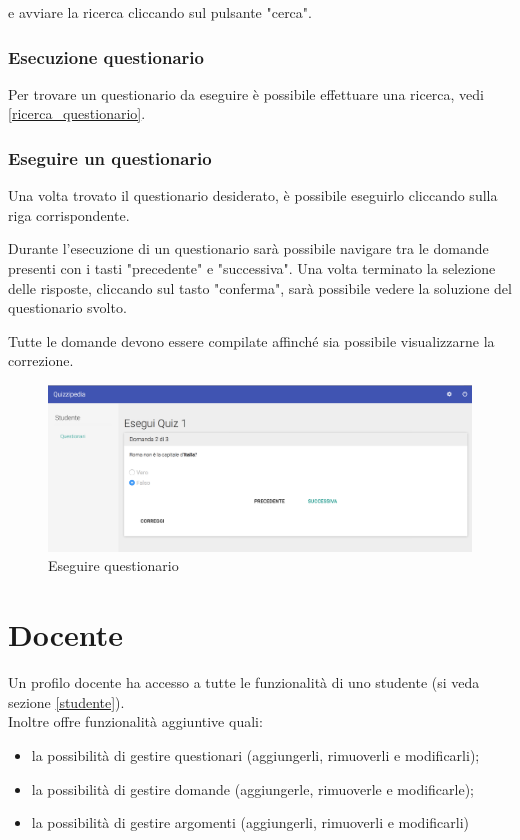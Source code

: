 \documentclass[12pt,a4paper]{article}
\begin{document}
	e avviare la ricerca cliccando sul pulsante "cerca".
	
	
	\subsubsection{Esecuzione questionario}
	Per trovare un questionario da eseguire è possibile effettuare una ricerca, vedi \ref{ricerca_questionario}.
	\subsubsection{Eseguire un questionario}
	\par Una volta trovato il questionario desiderato, è possibile eseguirlo cliccando sulla riga corrispondente. \\
	\par Durante l'esecuzione di un questionario sarà possibile navigare tra le domande presenti con i tasti "precedente" e "successiva".
	Una volta terminato la selezione delle risposte, cliccando sul tasto "conferma", sarà possibile vedere la soluzione del questionario svolto. \\
	\par Tutte le domande devono essere compilate affinché sia possibile visualizzarne la correzione. \\
	
	\begin{figure}[H]	
		\centering
		\includegraphics[width=1.0\linewidth]{../img/screenshot/esecuzioneQuestionario.png}
		\caption{Eseguire questionario}
		\label{Eseguire questionario}
	\end{figure}
	
	\section{Docente}\label{docente}
	Un profilo docente ha accesso a tutte le funzionalità di uno studente (si veda sezione \ref{studente}). \\
		Inoltre offre funzionalità aggiuntive quali:
		\begin{itemize}
			\item la possibilità di gestire questionari (aggiungerli, rimuoverli e modificarli);
			\item la possibilità di gestire domande (aggiungerle, rimuoverle e modificarle);
			\item la possibilità di gestire argomenti (aggiungerli, rimuoverli e modificarli)
		\end{itemize}
\end{document}
